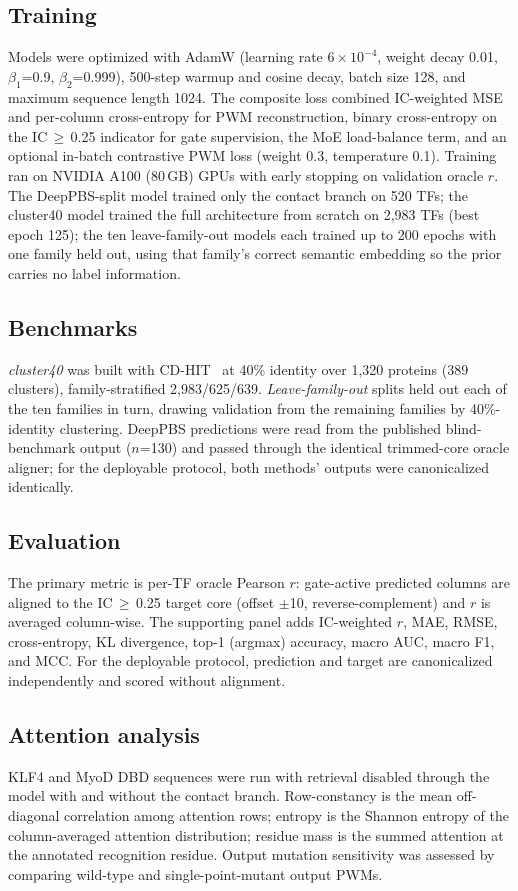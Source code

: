 \documentclass[11pt,letterpaper]{article}
\begin{document}
\subsection*{Training}
Models were optimized with AdamW (learning rate $6\times10^{-4}$, weight decay 0.01,
$\beta_1$=0.9, $\beta_2$=0.999), 500-step warmup and cosine decay, batch size 128,
and maximum sequence length 1024. The composite loss combined IC-weighted MSE and
per-column cross-entropy for PWM reconstruction, binary cross-entropy on the
IC\,$\geq$\,0.25 indicator for gate supervision, the MoE load-balance term, and an
optional in-batch contrastive PWM loss (weight 0.3, temperature 0.1). Training ran
on NVIDIA A100 (80\,GB) GPUs with early stopping on validation oracle $r$. The
DeepPBS-split model trained only the contact branch on 520 TFs; the cluster40 model
trained the full architecture from scratch on 2,983 TFs (best epoch 125); the ten
leave-family-out models each trained up to 200 epochs with one family held out,
using that family's correct semantic embedding so the prior carries no label
information.

\subsection*{Benchmarks}
\textit{cluster40} was built with CD-HIT~\cite{LiGodzik2006} at 40\% identity over
1,320 proteins (389 clusters), family-stratified 2,983/625/639. \textit{Leave-family-out}
splits held out each of the ten families in turn, drawing validation from the
remaining families by 40\%-identity clustering. DeepPBS predictions were read from
the published blind-benchmark output ($n$=130) and passed through the identical
trimmed-core oracle aligner; for the deployable protocol, both methods' outputs were
canonicalized identically.

\subsection*{Evaluation}
The primary metric is per-TF oracle Pearson $r$: gate-active predicted columns are
aligned to the IC\,$\geq$\,0.25 target core (offset $\pm$10, reverse-complement) and
$r$ is averaged column-wise. The supporting panel adds IC-weighted $r$, MAE, RMSE,
cross-entropy, KL divergence, top-1 (argmax) accuracy, macro AUC, macro F1, and MCC.
For the deployable protocol, prediction and target are canonicalized independently
and scored without alignment.

\subsection*{Attention analysis}
KLF4 and MyoD DBD sequences were run with retrieval disabled through the model with
and without the contact branch. Row-constancy is the mean off-diagonal correlation
among attention rows; entropy is the Shannon entropy of the column-averaged
attention distribution; residue mass is the summed attention at the annotated
recognition residue. Output mutation sensitivity was assessed by comparing
wild-type and single-point-mutant output PWMs.
\end{document}
